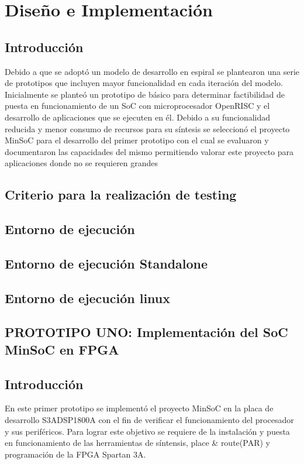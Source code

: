 \chapter{Diseño e Implementación}
	\section{Introducción}
	Debido a que se adoptó un modelo de desarrollo en espiral se plantearon una serie de prototipos que incluyen mayor funcionalidad en cada iteración
	del modelo. Inicialmente se planteó un prototipo de básico para determinar factibilidad de puesta en funcionamiento de un SoC con microprocesador
	OpenRISC y el desarrollo de aplicaciones que se ejecuten en él. Debido a su funcionalidad reducida y menor consumo de recursos para su
	síntesis se seleccionó el proyecto MinSoC para el desarrollo del primer prototipo con el cual se evaluaron y documentaron las capacidades del mismo
	permitiendo valorar este proyecto para aplicaciones donde no se requieren grandes 
		 
	\section{Criterio para la realización de testing}
	\section{Entorno de ejecución}
		\section{Entorno de ejecución Standalone}
		\section{Entorno de ejecución linux}
	
	\section{PROTOTIPO UNO: Implementación del SoC MinSoC en FPGA}
		\section{Introducción}
		En este primer prototipo se implementó el proyecto MinSoC en la placa de desarrollo S3ADSP1800A con el fin de verificar el funcionamiento
		del procesador y sus periféricos. Para lograr este objetivo se requiere de la instalación y puesta en funcionamiento de las herramientas
		de síntensis, place \& route(PAR) y programación de la FPGA Spartan 3A. 
		
